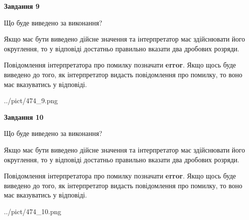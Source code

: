 \documentclass[12pt, ukrainian]{article}
\begin{document}
{\begin {Large}
{\begin {center}\textbf{Завдання 9}\end {center}}\par
Що буде виведено за виконання? \par

Якщо має бути виведено дійсне значення та інтерпретатор має здійснювати його округлення, 
то у відповіді достатньо правильно вказати два дробових розряди.

Повідомлення інтерпретатора про помилку позначати \textbf{error}.
Якщо щось буде виведено до того, як інтерпретатор видасть повідомлення про помилку, 
то воно має вказуватись у відповіді. \par

\begin{center}
	{../pict/474_9.png}
\end{center}
\newpage

{\begin {center}\textbf{Завдання 10}\end {center}}\par
Що буде виведено за виконання? \par

Якщо має бути виведено дійсне значення та інтерпретатор має здійснювати його округлення, 
то у відповіді достатньо правильно вказати два дробових розряди.

Повідомлення інтерпретатора про помилку позначати \textbf{error}.
Якщо щось буде виведено до того, як інтерпретатор видасть повідомлення про помилку, 
то воно має вказуватись у відповіді. \par

\begin{center}
	{../pict/474_10.png}
\end{center}
\newpage

\end {Large}}
\end{document}
